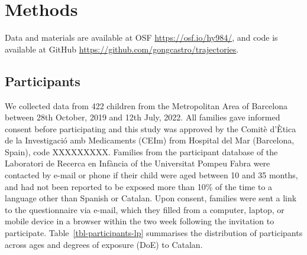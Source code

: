 \documentclass[
  letterpaper,
  DIV=11,
  numbers=noendperiod]{scrartcl}
\begin{document}
\hypertarget{methods}{%
\section{Methods}\label{methods}}

Data and materials are available at OSF \url{https://osf.io/hy984/}, and
code is available at GitHub
\url{https://github.com/gongcastro/trajectories}.

\hypertarget{participants}{%
\subsection{Participants}\label{participants}}

We collected data from 422 children from the Metropolitan Area of
Barcelona between 28th October, 2019 and 12th July, 2022. All families
gave informed consent before participating and this study was approved
by the Comitè d'Ètica de la Investigació amb Medicaments (CEIm) from
Hospital del Mar (Barcelona, Spain), code XXXXXXXXX. Families from the
participant database of the Laboratori de Recerca en Infància of the
Universitat Pompeu Fabra were contacted by e-mail or phone if their
child were aged between 10 and 35 months, and had not been reported to
be exposed more than 10\% of the time to a language other than Spanish
or Catalan. Upon consent, families were sent a link to the questionnaire
via e-mail, which they filled from a computer, laptop, or mobile device
in a browser within the two week following the invitation to
participate. Table~\ref{tbl-participants-lp} summarises the distribution
of participants across ages and degrees of exposure (DoE) to Catalan.
\end{document}
